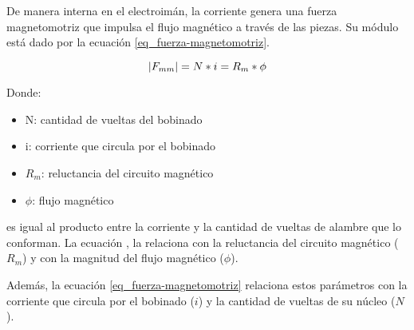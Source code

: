 \noindent De manera interna en el electroimán, la corriente genera una fuerza magnetomotriz que impulsa el flujo magnético a través de las piezas. Su módulo está dado por la ecuación \ref{eq_fuerza-magnetomotriz}.






\begin{equation} \label{eq_fuerza-magnetomotriz}
	\lvert F_{mm}\rvert=N*i=R_{m}*\phi	
\end{equation}

\noindent Donde: 
\begin{itemize}
	\item N: cantidad de vueltas del bobinado
	\item i: corriente que circula por el bobinado
	\item $R_{m}$: reluctancia del circuito magnético
	\item $\phi$: flujo magnético
\end{itemize}

es igual al producto entre la corriente y la cantidad de vueltas de alambre que lo conforman. La ecuación , la relaciona con la reluctancia del circuito magnético ($R_{m}$) y con la magnitud del flujo magnético ($\phi$).

\noindent Además, la ecuación \ref{eq_fuerza-magnetomotriz}  relaciona estos parámetros con la corriente que circula por el bobinado ($i$) y la cantidad de vueltas de su núcleo ($N$).


